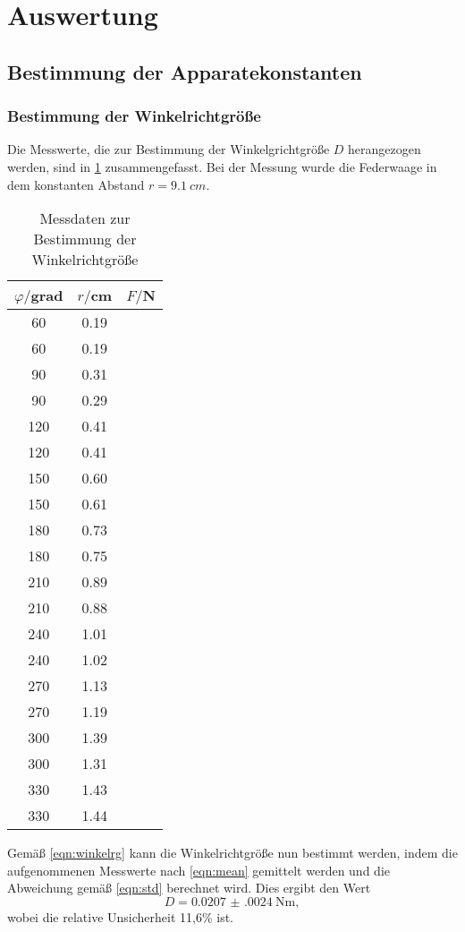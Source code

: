 \section{Auswertung}
\subsection{Bestimmung der Apparatekonstanten}
\subsubsection{Bestimmung der Winkelrichtgröße}
Die Messwerte, die zur Bestimmung der Winkelgrichtgröße $D$ herangezogen werden,
sind in \ref{tab:winkelrichtgroesse} zusammengefasst. Bei der Messung wurde die
Federwaage in dem konstanten Abstand $r=\SI{9.1}{cm}$.
\begin{table}
\centering
\caption{Messdaten zur Bestimmung der Winkelrichtgröße}
\label{tab:winkelrichtgroesse}
\begin{tabular}{c c c}
\toprule
$\varphi/$grad & $r/$cm & $F/$N \\
\midrule
 60	& 0.19 \\
 60	& 0.19 \\
 90	& 0.31 \\
 90	& 0.29 \\
120 &	0.41 \\
120 &	0.41 \\
150 &	0.60 \\
150 &	0.61 \\
180 &	0.73 \\
180 &	0.75 \\
210 &	0.89 \\
210 &	0.88 \\
240 &	1.01 \\
240 &	1.02 \\
270 &	1.13 \\
270 &	1.19 \\
300 &	1.39 \\
300 &	1.31 \\
330 &	1.43 \\
330 &	1.44 \\
\bottomrule
\end{tabular}
\end{table}
Gemäß \eqref{eqn:winkelrg} kann die Winkelrichtgröße nun bestimmt werden, indem
die aufgenommenen Messwerte nach \eqref{eqn:mean} gemittelt werden und die
Abweichung gemäß \eqref{eqn:std} berechnet wird. Dies ergibt den Wert
\begin{equation}
  D = \SI{0.0207(0024)}{\newton\meter},
\end{equation}
wobei die relative Unsicherheit 11,6\% ist.
